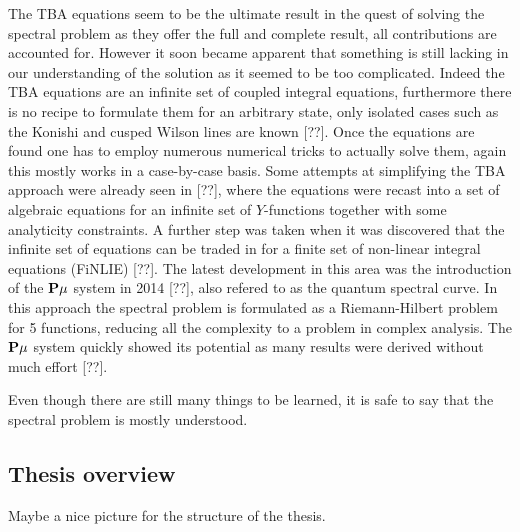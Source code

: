 The TBA equations seem to be the ultimate result in the quest of solving the spectral problem as they offer the full and complete result, all contributions are accounted for.
However it soon became apparent that something is still lacking in our understanding of the solution as it seemed to be too complicated.
Indeed the TBA equations are an infinite set of coupled integral equations, furthermore there is no recipe to formulate them for an arbitrary state, only isolated cases such as the Konishi and cusped Wilson lines are known [??].
Once the equations are found one has to employ numerous numerical tricks to actually solve them, again this mostly works in a case-by-case basis.
Some attempts at simplifying the TBA approach were already seen in [??], where the equations were recast into a set of algebraic equations for an infinite set of $Y$-functions together with some analyticity constraints.
A further step was taken when it was discovered that the infinite set of equations can be traded in for a finite set of non-linear integral equations (FiNLIE) [??].
The latest development in this area was the introduction of the ${\bf P}\mu$ system in 2014 [??], also refered to as the quantum spectral curve.
In this approach the spectral problem is formulated as a Riemann-Hilbert problem for 5 functions, reducing all the complexity to a problem in complex analysis.
The ${\bf P}\mu$ system quickly showed its potential as many results were derived without much effort [??].

Even though there are still many things to be learned, it is safe to say that the spectral problem is mostly understood. 


\subsection{Thesis overview}

Maybe a nice picture for the structure of the thesis.
